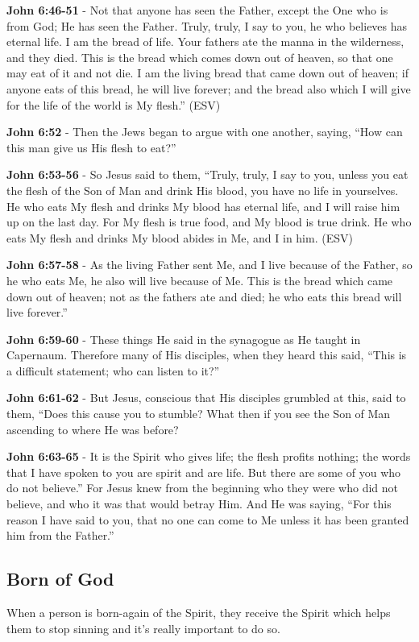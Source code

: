 \documentclass[11pt]{article}
\begin{document}
\textbf{John 6:46-51} - Not that anyone has seen the Father, except the One who is from God; He has seen the Father. Truly, truly, I say to you, he who believes has eternal life. I am the bread of life. Your fathers ate the manna in the wilderness, and they died. This is the bread which comes down out of heaven, so that one may eat of it and not die. I am the living bread that came down out of heaven; if anyone eats of this bread, he will live forever; and the bread also which I will give for the life of the world is My flesh.” (ESV)

\textbf{John 6:52} - Then the Jews began to argue with one another, saying, “How can this man give us His flesh to eat?”

\textbf{John 6:53-56} - So Jesus said to them, “Truly, truly, I say to you, unless you eat the flesh of the Son of Man and drink His blood, you have no life in yourselves. He who eats My flesh and drinks My blood has eternal life, and I will raise him up on the last day. For My flesh is true food, and My blood is true drink. He who eats My flesh and drinks My blood abides in Me, and I in him. (ESV)

\textbf{John 6:57-58} - As the living Father sent Me, and I live because of the Father, so he who eats Me, he also will live because of Me. This is the bread which came down out of heaven; not as the fathers ate and died; he who eats this bread will live forever.”

\textbf{John 6:59-60} - These things He said in the synagogue as He taught in Capernaum. Therefore many of His disciples, when they heard this said, “This is a difficult statement; who can listen to it?”

\textbf{John 6:61-62} - But Jesus, conscious that His disciples grumbled at this, said to them, “Does this cause you to stumble? What then if you see the Son of Man ascending to where He was before?

\textbf{John 6:63-65} - It is the Spirit who gives life; the flesh profits nothing; the words that I have spoken to you are spirit and are life. But there are some of you who do not believe.” For Jesus knew from the beginning who they were who did not believe, and who it was that would betray Him. And He was saying, “For this reason I have said to you, that no one can come to Me unless it has been granted him from the Father.”

\subsection{Born of God}
\label{sec:org812ff5d}
When a person is born-again of the Spirit, they receive the Spirit which helps them to stop sinning and it's really important to do so.
\end{document}
